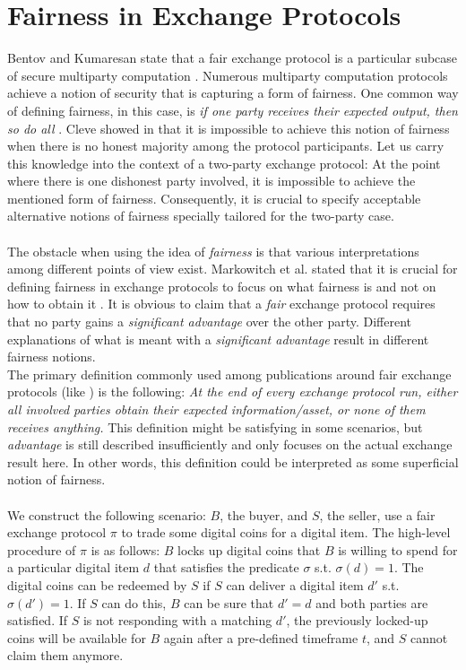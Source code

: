 \documentclass{cacthesis}
\newcounter{protocol}
\begin{document}
    \chapter{Fairness in Exchange Protocols}
    \label{sec:Fairness}
        Bentov and Kumaresan state that a fair exchange protocol is a particular subcase of secure multiparty computation \cite{10.1007/978-3-662-44381-1_24}. Numerous multiparty computation protocols achieve a notion of security that is capturing a form of fairness. One common way of defining fairness, in this case, is \textit{if one party receives their expected output, then so do all} \cite{10.1007/978-3-540-79263-5_8}. Cleve showed in \cite{10.1145/12130.12168} that it is impossible to achieve this notion of fairness when there is no honest majority among the protocol participants. Let us carry this knowledge into the context of a two-party exchange protocol: At the point where there is one dishonest party involved, it is impossible to achieve the mentioned form of fairness. Consequently, it is crucial to specify acceptable alternative notions of fairness specially tailored for the two-party case.   \\\\
        The obstacle when using the idea of \textit{fairness} is that various interpretations among different points of view exist. Markowitch et al. stated that it is crucial for defining fairness in exchange protocols to focus on what fairness is and not on how to obtain it \cite{10.1007/3-540-36552-4_31}. It is obvious to claim that a \textit{fair} exchange protocol requires that no party gains a \textit{significant advantage} over the other party. Different explanations of what is meant with a \textit{significant advantage} result in different fairness notions. \\
        The primary definition commonly used among publications around fair exchange protocols (like \cite{10.1145/266420.266426} \cite{asyncOptiFairEx1998} \cite{remarksOnFairEx2000})  is the following: \textit{At the end of every exchange protocol run, either all involved parties obtain their expected information/asset, or none of them receives anything.} This definition might be satisfying in some scenarios, but \textit{advantage} is still described insufficiently and only focuses on the actual exchange result here. In other words, this definition could be interpreted as some superficial notion of fairness. \\\\
        We construct the following scenario: $B$, the buyer, and $S$, the seller, use a fair exchange protocol $\pi$ to trade some digital coins for a digital item. The high-level procedure of $\pi$ is as follows: $B$ locks up digital coins that $B$ is willing to spend for a particular digital item $d$ that satisfies the predicate $\sigma$ s.t. $\sigma\left( d\right) =1$. The digital coins can be redeemed by $S$ if $S$ can deliver a digital item $d'$ s.t. $\sigma\left( d'\right) =1$. If $S$ can do this, $B$ can be sure that $d' = d$ and both parties are satisfied. If $S$ is not responding with a matching $d'$, the previously locked-up coins will be available for $B$ again after a pre-defined timeframe $t$, and $S$ cannot claim them anymore. \\
\end{document}
